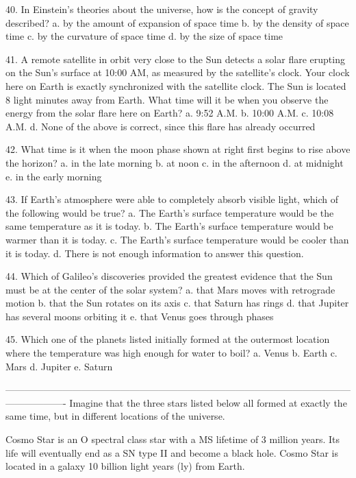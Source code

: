 40. In Einstein’s theories about the universe, how is the concept of gravity described? 
a. by the amount of expansion of space time
b. by the density of space time
c. by the curvature of space time
d. by the size of space time

41. A remote satellite in orbit very close to the Sun detects a solar flare erupting on the Sun’s surface at 10:00 AM, as measured by the satellite’s clock. Your clock here on Earth is exactly synchronized with the satellite clock. The Sun is located 8 light minutes away from Earth. What time will it be when you observe the energy from the solar flare here on Earth?
a. 9:52 A.M.
b. 10:00 A.M.
c. 10:08 A.M.
d. None of the above is correct, since this flare has already occurred


42. What time is it when the moon phase shown at right first begins to rise above the horizon?
a. in the late morning 
b. at noon
c. in the afternoon
d. at midnight 
e. in the early morning



43. If Earth’s atmosphere were able to completely absorb visible light, which of the following would be true? 
a. The Earth’s surface temperature would be the same temperature as it is today.
b. The Earth’s surface temperature would be warmer than it is today.
c. The Earth’s surface temperature would be cooler than it is today.
d.  There is not enough information to answer this question.

 

44. Which of Galileo’s discoveries provided the greatest evidence that the Sun must be at the center of the solar system?
a. that Mars moves with retrograde motion
b. that the Sun rotates on its axis
c. that Saturn has rings
d. that Jupiter has several moons orbiting it
e. that Venus goes through phases


45. Which one of the planets listed initially formed at the outermost location where the temperature was high enough for water to boil?  
a. Venus
b. Earth
c. Mars
d. Jupiter
e. Saturn

-------------------------------------------------------------------------------------------------------------------------------
Imagine that the three stars listed below all formed at exactly the same time, but in different locations of the universe.  

Cosmo Star is an O spectral class star with a MS lifetime of 3 million years.  Its life will eventually end as a SN type II and become a black hole.  Cosmo Star is located in a galaxy 10 billion light years (ly) from Earth.

